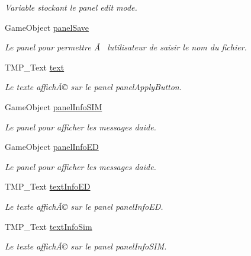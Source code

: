 \begin{DoxyCompactItemize}
\begin{DoxyCompactList}\small\item\em Variable stockant le panel edit mode. \end{DoxyCompactList}\item 
Game\+Object \mbox{\hyperlink{class_navigation_acea32f74d9820c1cd657a3e5371f1a58}{panel\+Save}}
\begin{DoxyCompactList}\small\item\em Le panel pour permettre Ã  l\textquotesingle{}utilisateur de saisir le nom du fichier. \end{DoxyCompactList}\item 
T\+M\+P\+\_\+\+Text \mbox{\hyperlink{class_navigation_ac6f0605a263e970630f2946dbc8f5ca3}{text}}
\begin{DoxyCompactList}\small\item\em Le texte affichÃ© sur le panel panel\+Apply\+Button. \end{DoxyCompactList}\item 
Game\+Object \mbox{\hyperlink{class_navigation_a12eac73989286c8368155f21bc6d5156}{panel\+Info\+S\+IM}}
\begin{DoxyCompactList}\small\item\em Le panel pour afficher les messages d\textquotesingle{}aide. \end{DoxyCompactList}\item 
Game\+Object \mbox{\hyperlink{class_navigation_addc473bc967fa8543b016df5b5411b3e}{panel\+Info\+ED}}
\begin{DoxyCompactList}\small\item\em Le panel pour afficher les messages d\textquotesingle{}aide. \end{DoxyCompactList}\item 
T\+M\+P\+\_\+\+Text \mbox{\hyperlink{class_navigation_af2ad653f49a97486583aa60103af3e6d}{text\+Info\+ED}}
\begin{DoxyCompactList}\small\item\em Le texte affichÃ© sur le panel panel\+Info\+ED. \end{DoxyCompactList}\item 
T\+M\+P\+\_\+\+Text \mbox{\hyperlink{class_navigation_aefa9a0108a63c721559a2ede11fad997}{text\+Info\+Sim}}
\begin{DoxyCompactList}\small\item\em Le texte affichÃ© sur le panel panel\+Info\+S\+IM. \end{DoxyCompactList}\end{DoxyCompactItemize}


